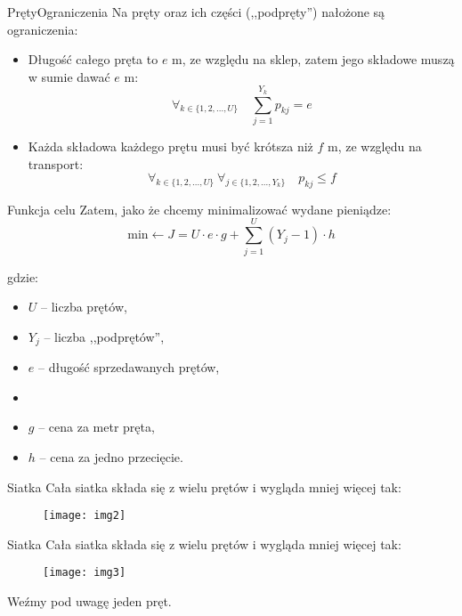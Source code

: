 \documentclass[11pt]{beamer}
\begin{document}
\begin{frame}{Pręty}{Ograniczenia}
Na pręty oraz ich części (,,podpręty'') nałożone są ograniczenia:
\begin{itemize}
\item<1-> Długość całego pręta to $e$ m, ze względu na sklep, zatem jego składowe muszą w sumie dawać $e$ m:
\begin{equation*}
\forall_{k \in \{1, 2, ..., U\}} \quad \sum_{j = 1}^{Y_k} p_{kj} = e
\end{equation*}

\item<2-> Każda składowa każdego prętu musi być krótsza niż $f$ m, ze względu na transport:
\begin{equation*}
\forall_{k \in \{1, 2, ..., U\}} \ \forall_{j \in \{1, 2, ..., Y_k\}} \quad
p_{kj} \le f
\end{equation*}
\end{itemize}
\end{frame}

\begin{frame}{Funkcja celu}
Zatem, jako że chcemy minimalizować wydane pieniądze:
\begin{equation*}
\text{min} \leftarrow J = U \cdot e \cdot g + \sum_{j = 1}^{U} (Y_j - 1) \cdot h
\end{equation*}

gdzie:
\begin{itemize}
\item[ ] $U$ -- liczba prętów,
\item[ ] $Y_j$ -- liczba ,,podprętów'',
\item[ ] $e$ -- długość sprzedawanych prętów,
\item[ ]
\item[ ] $g$ -- cena za metr pręta,
\item[ ] $h$ -- cena za jedno przecięcie.
\end{itemize}
\end{frame}



\begin{frame}{Siatka}
Cała siatka składa się z wielu prętów i wygląda mniej więcej tak:
\begin{figure}[h!]
	\centering
	\texttt{[image: img2]}
\end{figure}
\end{frame}

\begin{frame}{Siatka}
Cała siatka składa się z wielu prętów i wygląda mniej więcej tak:
\begin{figure}[h!]
	\centering
	\texttt{[image: img3]}
\end{figure}

Weźmy pod uwagę jeden pręt.
\end{frame}
\end{document}
